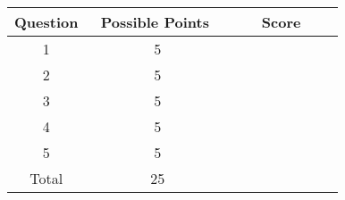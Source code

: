 \documentclass{article}
\theoremstyle{definition}
\newcommand{\0}{\textbf{0}}
\begin{document}

\vspace{1.5cm}



\begin{center}

{\renewcommand{\arraystretch}{2.5}
\begin{tabular}{|c|c|c|}
\hline
Question & \ Possible Points \ & \ \ \ Score \ \ \ \\
\hline 

1 & 5 & \\
\hline 

2 & 5 & \\
\hline

3 & 5 & \\
\hline

4 & 5 & \\
\hline 

5 & 5 & \\
\hline

Total & 25 & \\
\hline

\end{tabular}}

\end{center}


\newpage \label{Question 1}


\end{document}
